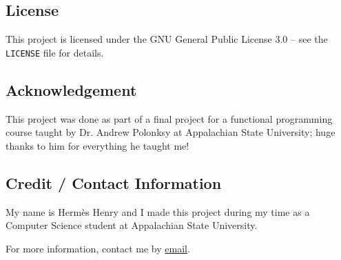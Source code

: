 \documentclass{article}
\begin{document}
\subsection{License}

This project is licensed under the GNU General Public License 3.0 -- see the \texttt{LICENSE} file for details.


\subsection{Acknowledgement}

This project was done as part of a final project for a functional programming course taught by Dr. Andrew Polonksy at Appalachian State University; huge thanks to him for everything he taught me!


\subsection{Credit / Contact Information}

My name is Hermès Henry and I made this project during my time as a Computer Science student at Appalachian State University.

For more information, contact me by \href{mailto:henryhe@appstate.edu}{email}.
\end{document}
